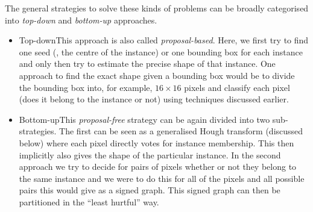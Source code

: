 The general strategies to solve these kinds of problems can be broadly
categorised into \emph{top-down} and \emph{bottom-up} approaches.
\begin{itemize}
\item Top-down\qquad This approach is also called \emph{proposal-based}. Here,
  we first try to find one seed (\ie, the centre of the instance) or one
  bounding box for each instance and only then try to estimate the precise shape
  of that instance. One approach to find the exact shape given a bounding box
  would be to divide the bounding box into, for example, $16 \times 16$ pixels
  and classify each pixel (does it belong to the instance or not) using
  techniques discussed earlier.
\item Bottom-up\qquad This \emph{proposal-free} strategy can be again divided
  into two sub-strategies. The first can be seen as a generalised Hough
  transform (discussed below) where each pixel directly votes for instance
  membership. This then implicitly also gives the shape of the particular
  instance. In the second approach we try to decide for pairs of pixels whether
  or not they belong to the same instance and we were to do this for all of the
  pixels and all possible pairs this would give as a signed graph. This signed
  graph can then be partitioned in the ``least hurtful'' way.
\end{itemize}

